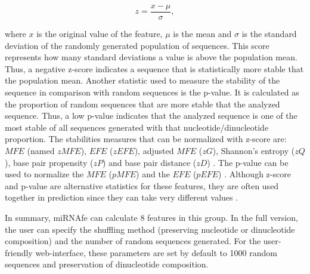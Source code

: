 \documentclass{article}
\begin{document}
\begin{equation}
 z = \frac{x-\mu}{\sigma},
\end{equation}

\noindent where $x$ is the original value of the feature, $\mu$ is the mean and $\sigma$ is the standard deviation of the randomly generated population of 
sequences. This score represents how many standard deviations a value is above the population mean. Thus, a negative z-score indicates a sequence that is 
statistically more stable that the population mean. Another statistic used to measure the stability of the sequence in comparison with random sequences is the 
p-value. It is calculated as the proportion of random sequences that are more stable that the analyzed sequence. Thus, a low p-value indicates that the 
analyzed sequence is one of the most stable of all sequences generated with that nucleotide/dinucleotide proportion. The stabilities measures that can be 
normalized with z-score are: $MFE$ (named $zMFE$), $EFE$ ($zEFE$), adjusted $MFE$ ($zG$), Shannon's entropy ($zQ$), base pair propensity ($zP$) \citep{Ng07} 
and base pair distance ($zD$) \citep{Jiandong10}. The p-value can be used to normalize the $MFE$ ($pMFE$) \citep{Bonnet04} and the $EFE$ ($pEFE$) 
\citep{Jiandong10}. Although z-score and p-value are alternative statistics for these features, they are often used together in prediction since they can take 
very different values \citep{Jiandong10}.

In summary, miRNAfe can calculate 8 features in this group. In the full version, the user can specify the shuffling method (preserving nucleotide or 
dinucleotide composition) and the number of random sequences generated. For the user-friendly web-interface, these parameters are set by default to 1000 random 
sequences and preservation of dinucleotide composition.
\end{document}

